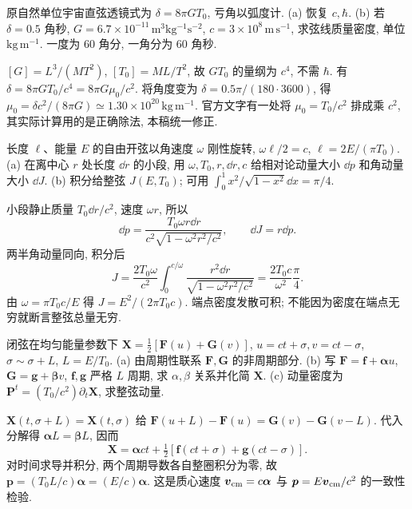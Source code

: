 \begin{exercise}
原自然单位宇宙直弦透镜式为 $\delta=8\pi GT_0$, 亏角以弧度计.
(a) 恢复 $c,\hbar$.
(b) 若 $\delta=0.5$ 角秒, $G=6.7\times10^{-11}\,\mathrm{m^3kg^{-1}s^{-2}}$, $c=3\times10^8\,\mathrm{m\,s^{-1}}$, 求弦线质量密度, 单位 $\mathrm{kg\,m^{-1}}$. 一度为 60 角分, 一角分为 60 角秒.
\end{exercise}
\begin{solution}
$[G]=L^3/(MT^2)$, $[T_0]=ML/T^2$, 故 $GT_0$ 的量纲为 $c^4$, 不需 $\hbar$. 有 $\delta=8\pi GT_0/c^4=8\pi G\mu_0/c^2$.
将角度变为 $\delta=0.5\pi/(180\cdot3600)$, 得
$\mu_0=\delta c^2/(8\pi G)\simeq1.30\times10^{20}\,\mathrm{kg\,m^{-1}}$.
官方文字有一处将 $\mu_0=T_0/c^2$ 排成乘 $c^2$, 其实际计算用的是正确除法, 本稿统一修正.
\end{solution}

\begin{exercise}
长度 $\ell$、能量 $E$ 的自由开弦以角速度 $\omega$ 刚性旋转, $\omega\ell/2=c$, $\ell=2E/(\pi T_0)$.
(a) 在离中心 $r$ 处长度 $\dd r$ 的小段, 用 $\omega,T_0,r,\dd r,c$ 给相对论动量大小 $\dd p$ 和角动量大小 $\dd J$.
(b) 积分给整弦 $J(E,T_0)$; 可用 $\int_0^1x^2/\sqrt{1-x^2}\dd x=\pi/4$.
\end{exercise}
\begin{solution}
小段静止质量 $T_0\dd r/c^2$, 速度 $\omega r$, 所以
\[
 \dd p=\frac{T_0\omega r\dd r}{c^2\sqrt{1-\omega^2r^2/c^2}},
 \qquad\dd J=r\dd p.
\]
两半角动量同向, 积分后
\[
 J=\frac{2T_0\omega}{c^2}\int_0^{c/\omega}
 \frac{r^2\dd r}{\sqrt{1-\omega^2r^2/c^2}}
 =\frac{2T_0c}{\omega^2}\frac\pi4.
\]
由 $\omega=\pi T_0c/E$ 得 $J=E^2/(2\pi T_0c)$.
端点密度发散可积; 不能因为密度在端点无穷就断言整弦总量无穷.
\end{solution}

\begin{exercise}
闭弦在均匀能量参数下
$\boldsymbol X=\frac12[\boldsymbol F(u)+\boldsymbol G(v)]$,
$u=ct+\sigma,v=ct-\sigma$, $\sigma\sim\sigma+L$, $L=E/T_0$.
(a) 由周期性联系 $\boldsymbol F,\boldsymbol G$ 的非周期部分.
(b) 写 $\boldsymbol F=\boldsymbol f+\boldsymbol\alpha u$,
$\boldsymbol G=\boldsymbol g+\boldsymbol\beta v$, $\boldsymbol f,\boldsymbol g$ 严格 $L$ 周期, 求 $\alpha,\beta$ 关系并化简 $\boldsymbol X$.
(c) 动量密度为 $\boldsymbol P^t=(T_0/c^2)\partial_t\boldsymbol X$, 求整弦动量.
\end{exercise}
\begin{solution}
$\boldsymbol X(t,\sigma+L)=\boldsymbol X(t,\sigma)$ 给
$\boldsymbol F(u+L)-\boldsymbol F(u)=\boldsymbol G(v)-\boldsymbol G(v-L)$.
代入分解得 $\boldsymbol\alpha L=\boldsymbol\beta L$, 因而
\[
 \boldsymbol X=\boldsymbol\alpha ct+
 \tfrac12[\boldsymbol f(ct+\sigma)+\boldsymbol g(ct-\sigma)].
\]
对时间求导并积分, 两个周期导数各自整圈积分为零, 故
$\boldsymbol p=(T_0L/c)\boldsymbol\alpha=(E/c)\boldsymbol\alpha$.
这是质心速度 $\boldsymbol v_{\rm cm}=c\boldsymbol\alpha$ 与
$\boldsymbol p=E\boldsymbol v_{\rm cm}/c^2$ 的一致性检验.
\end{solution}

